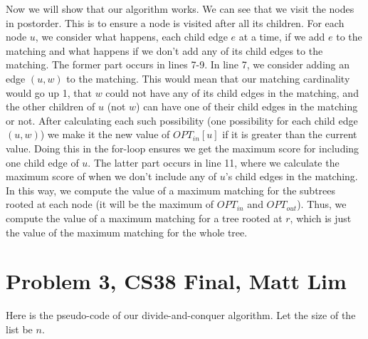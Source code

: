 \documentclass{article}
\begin{document}
Now we will show that our algorithm works. We can see that we visit the nodes in
postorder. This is to ensure a node is visited after all its children. For each
node $u$, we consider what happens, each child edge $e$ at a time, if we add
$e$ to the matching and what happens if we don't add any of its child
edges to the matching. The former part occurs in lines 7-9. In line 7, we
consider adding an edge $(u,w)$ to the matching. This would mean that our matching
cardinality would go up 1, that $w$ could not have any of its child edges in the
matching, and the other children of $u$ (not $w$) can have one of their child
edges in the matching or not. After calculating each such possibility (one
possibility for each child edge $(u,w)$) we make it the new value of
$OPT_{in}[u]$ if it is greater than the current value. Doing this in the
for-loop ensures we get the maximum score for including one child edge of $u$.
The latter part occurs in line 11, where we calculate the maximum score of when
we don't include any of $u$'s child edges in the matching. In this way, we
compute the value of a maximum matching for the subtrees rooted at each node (it
will be the maximum of $OPT_{in}$ and $OPT_{out}$).
Thus, we compute the value of a maximum matching for a tree rooted at $r$, which
is just the value of the maximum matching for the whole tree.
\newpage

\section*{Problem 3, CS38 Final, Matt Lim}
Here is the pseudo-code of our divide-and-conquer algorithm. Let the size of the
list be $n$.
\end{document}
